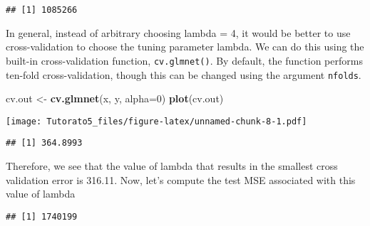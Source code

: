 \documentclass[
]{article}
\newenvironment{Shaded}{\begin{snugshade}}{\end{snugshade}}
\newcommand{\DataTypeTok}[1]{\textcolor[rgb]{0.13,0.29,0.53}{#1}}
\newcommand{\DecValTok}[1]{\textcolor[rgb]{0.00,0.00,0.81}{#1}}
\newcommand{\KeywordTok}[1]{\textcolor[rgb]{0.13,0.29,0.53}{\textbf{#1}}}
\newcommand{\NormalTok}[1]{#1}
\newcommand{\OperatorTok}[1]{\textcolor[rgb]{0.81,0.36,0.00}{\textbf{#1}}}
\newcommand{\StringTok}[1]{\textcolor[rgb]{0.31,0.60,0.02}{#1}}
\begin{document}
\begin{verbatim}
## [1] 1085266
\end{verbatim}

In general, instead of arbitrary choosing lambda = 4, it would be better
to use cross-validation to choose the tuning parameter lambda. We can do
this using the built-in cross-validation function, \texttt{cv.glmnet()}.
By default, the function performs ten-fold cross-validation, though this
can be changed using the argument \texttt{nfolds}.

\begin{Shaded}
\begin{Highlighting}[]
\NormalTok{cv.out <-}\StringTok{ }\KeywordTok{cv.glmnet}\NormalTok{(x, y, }\DataTypeTok{alpha=}\DecValTok{0}\NormalTok{)}
\KeywordTok{plot}\NormalTok{(cv.out)}
\end{Highlighting}
\end{Shaded}

\texttt{[image: Tutorato5\_files/figure-latex/unnamed-chunk-8-1.pdf]}

\begin{Shaded}
\end{Shaded}

\begin{verbatim}
## [1] 364.8993
\end{verbatim}

Therefore, we see that the value of lambda that results in the smallest
cross validation error is 316.11. Now, let's compute the test MSE
associated with this value of lambda

\begin{Shaded}
\end{Shaded}

\begin{verbatim}
## [1] 1740199
\end{verbatim}
\end{document}
